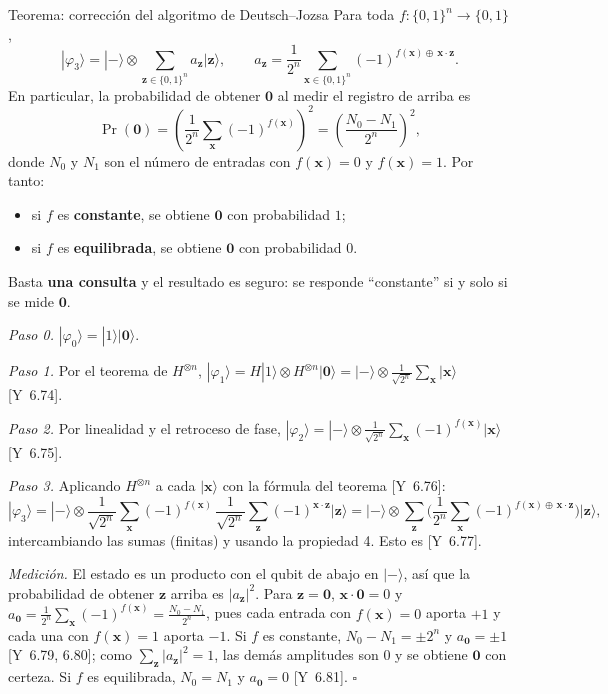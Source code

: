 \documentclass[11pt, a4paper, twoside, openright]{report}
\providecommand{\ket}[1]{|#1\rangle}
\newcommand{\bx}{\mathbf{x}}
\newcommand{\bz}{\mathbf{z}}
\newcommand{\bcero}{\mathbf{0}}
\newcommand{\bits}[1]{\{0,1\}^{#1}}
\newcommand{\Yan}[1]{\textcolor{rosaviejo}{\small[Y~#1]}}  %
\begin{document}
\begin{teoria}{Teorema: corrección del algoritmo de Deutsch--Jozsa}
Para toda $f:\bits{n}\to\{0,1\}$,
\[ \ket{\varphi_3} = \ket{-}\otimes\sum_{\bz\in\bits{n}} a_{\bz}\ket{\bz}, \qquad a_{\bz} = \frac{1}{2^n}\sum_{\bx\in\bits{n}}(-1)^{f(\bx)\oplus\,\bx\cdot\bz}. \]
En particular, la probabilidad de obtener $\bcero$ al medir el registro de arriba es
\[ \Pr(\bcero) = \left(\frac{1}{2^n}\sum_{\bx}(-1)^{f(\bx)}\right)^2 = \left(\frac{N_0 - N_1}{2^n}\right)^2, \]
donde $N_0$ y $N_1$ son el número de entradas con $f(\bx) = 0$ y $f(\bx) = 1$. Por tanto:
\begin{itemize}
\item si $f$ es \textbf{constante}, se obtiene $\bcero$ con probabilidad $1$;
\item si $f$ es \textbf{equilibrada}, se obtiene $\bcero$ con probabilidad $0$.
\end{itemize}
Basta \textbf{una consulta} y el resultado es seguro: se responde ``constante'' si y solo si se mide $\bcero$.
\end{teoria}

\begin{demo}
\textit{Paso 0.} $\ket{\varphi_0} = \ket{1}\ket{\bcero}$.

\textit{Paso 1.} Por el teorema de $H^{\otimes n}$, $\ket{\varphi_1} = H\ket{1}\otimes H^{\otimes n}\ket{\bcero} = \ket{-}\otimes\frac{1}{\sqrt{2^n}}\sum_{\bx}\ket{\bx}$ \Yan{6.74}.

\textit{Paso 2.} Por linealidad y el retroceso de fase, $\ket{\varphi_2} = \ket{-}\otimes\frac{1}{\sqrt{2^n}}\sum_{\bx}(-1)^{f(\bx)}\ket{\bx}$ \Yan{6.75}.

\textit{Paso 3.} Aplicando $H^{\otimes n}$ a cada $\ket{\bx}$ con la fórmula del teorema \Yan{6.76}:
\[ \ket{\varphi_3} = \ket{-}\otimes\frac{1}{\sqrt{2^n}}\sum_{\bx}(-1)^{f(\bx)}\,\frac{1}{\sqrt{2^n}}\sum_{\bz}(-1)^{\bx\cdot\bz}\ket{\bz} = \ket{-}\otimes\sum_{\bz}\Big(\frac{1}{2^n}\sum_{\bx}(-1)^{f(\bx)\oplus\,\bx\cdot\bz}\Big)\ket{\bz}, \]
intercambiando las sumas (finitas) y usando la propiedad 4. Esto es \Yan{6.77}.

\textit{Medición.} El estado es un producto con el qubit de abajo en $\ket{-}$, así que la probabilidad de obtener $\bz$ arriba es $|a_{\bz}|^2$. Para $\bz = \bcero$, $\bx\cdot\bcero = 0$ y $a_{\bcero} = \frac{1}{2^n}\sum_{\bx}(-1)^{f(\bx)} = \frac{N_0 - N_1}{2^n}$, pues cada entrada con $f(\bx) = 0$ aporta $+1$ y cada una con $f(\bx) = 1$ aporta $-1$. Si $f$ es constante, $N_0 - N_1 = \pm2^n$ y $a_{\bcero} = \pm1$ \Yan{6.79, 6.80}; como $\sum_{\bz}|a_{\bz}|^2 = 1$, las demás amplitudes son $0$ y se obtiene $\bcero$ con certeza. Si $f$ es equilibrada, $N_0 = N_1$ y $a_{\bcero} = 0$ \Yan{6.81}. \hfill$\square$
\end{demo}
\end{document}
